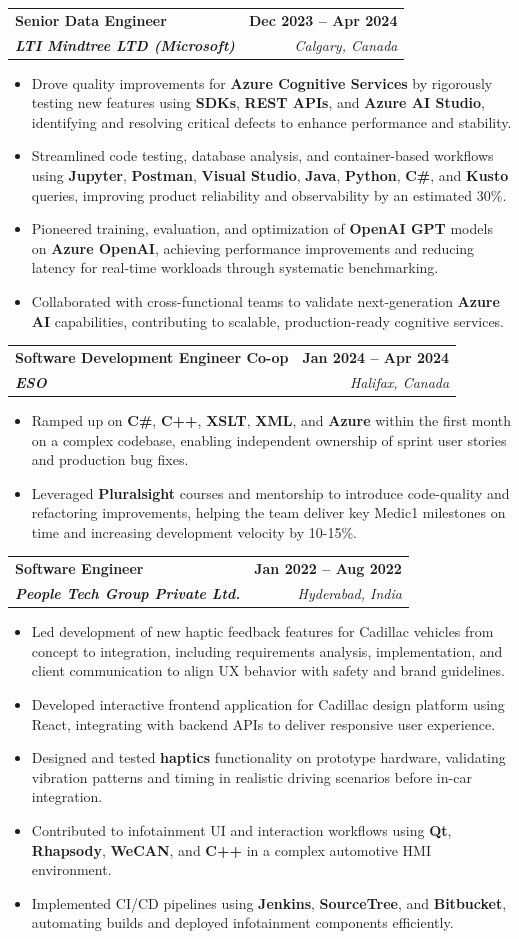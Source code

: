 \documentclass[letterpaper,11pt]{article}
\makeatletter
\newcommand{\resumeItem}[1]{
  \item\small{
    {#1 \vspace{-2pt}}
  }
}
\newcommand{\resumeSubheading}[4]{
  \vspace{-2pt}\item
    \begin{tabular*}{1.0\textwidth}[t]{l@{\extracolsep{\fill}}r}
      \textbf{#1} & \textbf{\small #2} \\
      \textit{\small#3} & \textit{\small #4} \\
    \end{tabular*}\vspace{-7pt}
}
\newcommand{\resumeItemListStart}{\begin{itemize}}
\newcommand{\resumeItemListEnd}{\end{itemize}\vspace{-5pt}}
\makeatother
\begin{document}
    \resumeSubheading
      {\textbf{Senior Data Engineer}}{\textbf{Dec 2023 -- Apr 2024}}
      {\textbf{LTI Mindtree LTD (Microsoft)}}{Calgary, Canada}
      \resumeItemListStart
        \resumeItem{Drove quality improvements for \textbf{Azure Cognitive Services} by rigorously testing new features using \textbf{SDKs}, \textbf{REST APIs}, and \textbf{Azure AI Studio}, identifying and resolving critical defects to enhance performance and stability.}
        \resumeItem{Streamlined code testing, database analysis, and container-based workflows using \textbf{Jupyter}, \textbf{Postman}, \textbf{Visual Studio}, \textbf{Java}, \textbf{Python}, \textbf{C\#}, and \textbf{Kusto} queries, improving product reliability and observability by an estimated 30\%.}
        \resumeItem{Pioneered training, evaluation, and optimization of \textbf{OpenAI GPT} models on \textbf{Azure OpenAI}, achieving performance improvements and reducing latency for real-time workloads through systematic benchmarking.}
        \resumeItem{Collaborated with cross-functional teams to validate next-generation \textbf{Azure AI} capabilities, contributing to scalable, production-ready cognitive services.}
      \resumeItemListEnd
    
    \resumeSubheading
      {\textbf{Software Development Engineer Co-op}}{\textbf{Jan 2024 -- Apr 2024}}
      {\textbf{ESO}}{Halifax, Canada}
      \resumeItemListStart
        \resumeItem{Ramped up on \textbf{C\#}, \textbf{C++}, \textbf{XSLT}, \textbf{XML}, and \textbf{Azure} within the first month on a complex codebase, enabling independent ownership of sprint user stories and production bug fixes.}
        \resumeItem{Leveraged \textbf{Pluralsight} courses and mentorship to introduce code-quality and refactoring improvements, helping the team deliver key Medic1 milestones on time and increasing development velocity by 10-15\%.}
      \resumeItemListEnd

    \resumeSubheading
      {\textbf{Software Engineer}}{\textbf{Jan 2022 -- Aug 2022}}
      {\textbf{People Tech Group Private Ltd.}}{Hyderabad, India}
      \resumeItemListStart
        \resumeItem{Led development of new haptic feedback features for Cadillac vehicles from concept to integration, including requirements analysis, implementation, and client communication to align UX behavior with safety and brand guidelines.}
        \resumeItem{Developed interactive frontend application for Cadillac design platform using React, integrating with backend APIs to deliver responsive user experience.}
        \resumeItem{Designed and tested \textbf{haptics} functionality on prototype hardware, validating vibration patterns and timing in realistic driving scenarios before in-car integration.}
        \resumeItem{Contributed to infotainment UI and interaction workflows using \textbf{Qt}, \textbf{Rhapsody}, \textbf{WeCAN}, and \textbf{C++} in a complex automotive HMI environment.}
        \resumeItem{Implemented CI/CD pipelines using \textbf{Jenkins}, \textbf{SourceTree}, and \textbf{Bitbucket}, automating builds and deployed infotainment components efficiently.}
      \resumeItemListEnd
\end{document}
